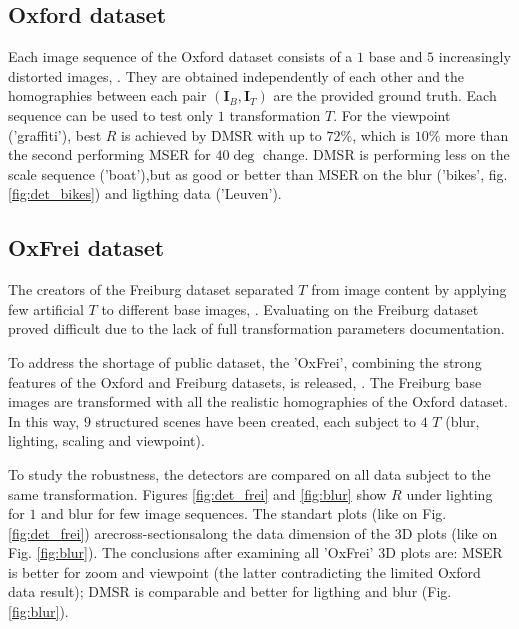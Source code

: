 \documentclass{article}
\def\I{{\mathbf I}}
\begin{document}
\subsection{Oxford dataset}
\label{ssec:oxford}
Each image sequence of the Oxford dataset consists of a $1$ base and $5$ increasingly distorted images, \cite{Mikolajczyk:2005}. They are obtained independently of each other and the homographies between each pair $(\I_B,\I_T)$ are the provided  ground truth. Each sequence can be used to test only $1$ transformation $T$.
For the viewpoint ('graffiti'), best $R$ is achieved by DMSR with up to $72 \%$, which is $10\%$ more than the second performing MSER for $40\deg$ change. DMSR is performing less on the scale sequence ('boat'),but as good or better than MSER on the blur ('bikes', fig. \ref{fig:det_bikes}) and ligthing data ('Leuven').

\subsection{OxFrei dataset}
\label{ssec:combined}
The creators of the Freiburg dataset separated $T$ from image content by applying few artificial $T$ to different base images, \cite{FischerDB14}. Evaluating on the Freiburg dataset proved difficult due to the lack of full transformation parameters documentation. 

To address the shortage of public dataset, the 'OxFrei', combining the strong features of the Oxford and Freiburg datasets, is released, \cite{Rang:dataset}. The Freiburg base images are transformed with all the realistic homographies of the Oxford dataset. In this way, $9$ structured scenes have been created, each subject to $4$ $T$ (blur, lighting, scaling and viewpoint).

To study the robustness, the detectors are compared on all data subject to the same transformation. Figures \ref{fig:det_frei} and \ref{fig:blur} show $R$ under lighting for $1$ and blur for few image sequences. The standart plots (like on Fig. \ref{fig:det_frei}) arecross-sectionsalong the data dimension of the 3D plots (like on Fig. \ref{fig:blur}). The conclusions after examining all 'OxFrei' 3D plots are: MSER is better for zoom and viewpoint (the latter contradicting the limited Oxford data result); DMSR is comparable and better for ligthing and blur  (Fig. \ref{fig:blur}).
\end{document}
